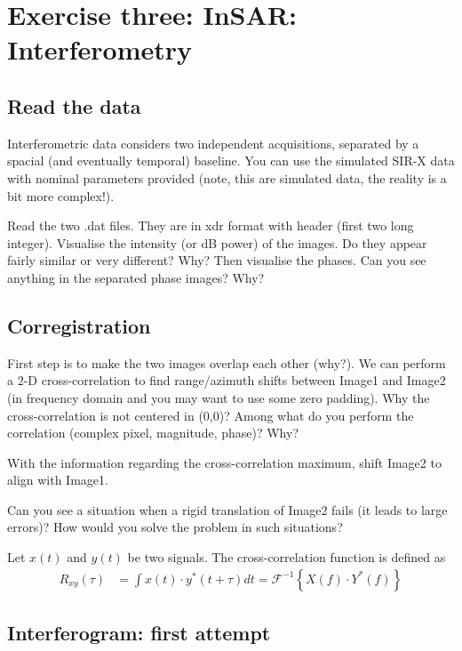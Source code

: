 \newpage
\section{Exercise three: InSAR: Interferometry}

\subsection{Read the data}

Interferometric data considers two independent acquisitions, separated by a spacial (and eventually temporal) baseline. You can use the simulated SIR-X data with nominal parameters provided (note, this are simulated data, the reality is a bit more complex!).

Read the two .dat files. They are in xdr format with header (first two long integer). Visualise the intensity (or dB power) of the images. Do they appear fairly similar or very different? Why? Then visualise the phases. Can you see anything in the separated phase images? Why?

\subsection{Corregistration}

First step is to make the two images overlap each other (why?). We can perform a 2-D cross-correlation to find range/azimuth shifts between Image1 and Image2 (in frequency domain and you may want to use some zero padding). Why the cross-correlation is not centered in (0,0)? Among what do you perform the correlation (complex pixel, magnitude, phase)? Why?

With the information regarding the cross-correlation maximum, shift Image2 to align with Image1.

Can you see a situation when a rigid translation of Image2 fails (it leads to large errors)? How would you solve the problem in such situations?

Let $x(t)$ and $y(t)$ be two signals. The cross-correlation function is defined as
 \begin{align}
 R_{xy}(\tau) &= \int x(t)\cdot y^*(t+\tau)dt = \mathcal{F}^{-1}\left\{X(f)\cdot Y^*(f)\right\}
 \end{align}

\subsection{Interferogram: first attempt}

